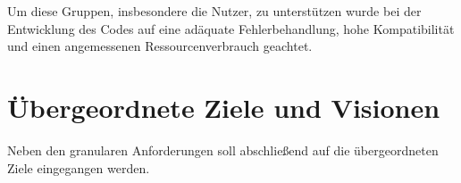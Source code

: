 	\vspace{0.25cm}
	
	Um diese Gruppen, insbesondere die Nutzer, zu unterstützen wurde bei der Entwicklung des Codes auf eine adäquate Fehlerbehandlung, hohe Kompatibilität und einen angemessenen Ressourcenverbrauch geachtet.
	
	\section{Übergeordnete Ziele und Visionen}
	
	Neben den granularen Anforderungen soll abschließend auf die übergeordneten Ziele eingegangen werden.    